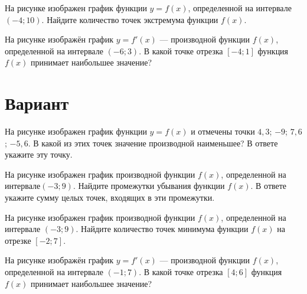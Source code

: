 \begin{taskBN}{3}
На рисунке изображен график функции $y=f(x)$, определенной на интервале $(-4;10)$. Найдите количество точек экстремума функции $f(x)$.
\end{taskBN}

\begin{taskBN}{4}
На рисунке изображён график $y=f'(x)$ — производной функции $f(x)$, определенной на интервале $(-6;3)$. В какой точке отрезка $[-4; 1]$ функция $f(x)$ принимает наибольшее значение?
\end{taskBN}

\newpage\section{Вариант}\begin{taskBN}{1}
На рисунке изображен график функции $y=f(x)$ и отмечены точки $4,3$; $-9$; $7,6$; $-5,6$. В какой из этих точек значение производной наименьшее? В ответе укажите эту точку. 
\end{taskBN}

\begin{taskBN}{2}
На рисунке изображен график производной функции $f(x)$, определенной на интервале$(-3; 9)$. Найдите промежутки убывания функции $f(x)$. В ответе укажите сумму целых точек, входящих в эти промежутки.
\end{taskBN}

\begin{taskBN}{3}
На рисунке изображен график производной функции $f(x)$, определенной на интервале $(-3;9)$. Найдите количество точек минимума функции $f(x)$ на отрезке $[-2;7]$. 
\end{taskBN}

\begin{taskBN}{4}
На рисунке изображён график $y=f'(x)$ — производной функции $f(x)$, определенной на интервале $(-1;7)$. В какой точке отрезка $[4; 6]$ функция $f(x)$ принимает наибольшее значение?
\end{taskBN}

